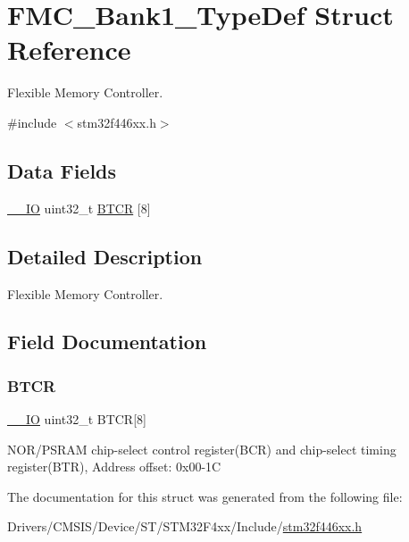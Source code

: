 \hypertarget{struct_f_m_c___bank1___type_def}{}\section{F\+M\+C\+\_\+\+Bank1\+\_\+\+Type\+Def Struct Reference}
\label{struct_f_m_c___bank1___type_def}


Flexible Memory Controller.  




{\ttfamily \#include $<$stm32f446xx.\+h$>$}

\subsection*{Data Fields}
\begin{DoxyCompactItemize}
\item 
\mbox{\hyperlink{core__sc300_8h_aec43007d9998a0a0e01faede4133d6be}{\+\_\+\+\_\+\+IO}} uint32\+\_\+t \mbox{\hyperlink{struct_f_m_c___bank1___type_def_a80a6708b507f6eecbc10424fdb088b79}{B\+T\+CR}} \mbox{[}8\mbox{]}
\end{DoxyCompactItemize}


\subsection{Detailed Description}
Flexible Memory Controller. 

\subsection{Field Documentation}
\mbox{\label{struct_f_m_c___bank1___type_def_a80a6708b507f6eecbc10424fdb088b79}} 
\subsubsection{\texorpdfstring{B\+T\+CR}{BTCR}}
{\footnotesize\ttfamily \mbox{\hyperlink{core__sc300_8h_aec43007d9998a0a0e01faede4133d6be}{\+\_\+\+\_\+\+IO}} uint32\+\_\+t B\+T\+CR\mbox{[}8\mbox{]}}

N\+O\+R/\+P\+S\+R\+AM chip-\/select control register(\+B\+C\+R) and chip-\/select timing register(\+B\+T\+R), Address offset\+: 0x00-\/1C 

The documentation for this struct was generated from the following file\+:\begin{DoxyCompactItemize}
\item 
Drivers/\+C\+M\+S\+I\+S/\+Device/\+S\+T/\+S\+T\+M32\+F4xx/\+Include/\mbox{\hyperlink{stm32f446xx_8h}{stm32f446xx.\+h}}\end{DoxyCompactItemize}
